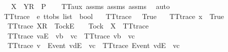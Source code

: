\begin{isabellebody}
\ \ \ {\isachardoublequoteopen}{\isacharbrackleft}{\isacharbrackleft}X\ {\isasymunion}\ Y{\isacharbrackright}\isactrlsub R{\isacharbrackright}\ {\isasymin}\ P{\isachardoublequoteclose}\isanewline
%
\isadelimproof
\ \ %
\endisadelimproof
%
\isatagproof
{}\isamarkupfalse%
\ TT{}{\isacharunderscore}aux{}\ assms{\isacharparenleft}{}{\isacharparenright}\ assms{\isacharparenleft}{}{\isacharparenright}\ assms{\isacharparenleft}{}{\isacharparenright}\ \isamarkupfalse%
\ auto%
\endisatagproof
{\isafoldproof}%
%
\isadelimproof
\isanewline
%
\endisadelimproof
\isanewline
{}\isamarkupfalse%
\ TT{}{\isacharunderscore}trace\ {\isacharcolon}{\isacharcolon}\ {\isachardoublequoteopen}{\isacharprime}e\ ttobs\ list\ {\isasymRightarrow}\ bool{\isachardoublequoteclose}\ \isanewline
\ \ {\isachardoublequoteopen}TT{}{\isacharunderscore}trace\ {\isacharbrackleft}{\isacharbrackright}\ {\isacharequal}\ True{\isachardoublequoteclose}\ {\isacharbar}\isanewline
\ \ {\isachardoublequoteopen}TT{}{\isacharunderscore}trace\ {\isacharbrackleft}x{\isacharbrackright}\ {\isacharequal}\ True{\isachardoublequoteclose}\ {\isacharbar}\isanewline
\ \ {\isachardoublequoteopen}TT{}{\isacharunderscore}trace\ {\isacharparenleft}{\isacharbrackleft}X{\isacharbrackright}\isactrlsub R\ {\isacharhash}\ {\isacharbrackleft}Tock{\isacharbrackright}\isactrlsub E\ {\isacharhash}\ {\isasymrho}{\isacharparenright}\ {\isacharequal}\ {\isacharparenleft}Tock\ {\isasymnotin}\ X\ {\isasymand}\ TT{}{\isacharunderscore}trace\ {\isasymrho}{\isacharparenright}{\isachardoublequoteclose}\ {\isacharbar}\isanewline
\ \ {\isachardoublequoteopen}TT{}{\isacharunderscore}trace\ {\isacharparenleft}{\isacharbrackleft}va{\isacharbrackright}\isactrlsub E\ {\isacharhash}\ vb\ {\isacharhash}\ vc{\isacharparenright}\ {\isacharequal}\ TT{}{\isacharunderscore}trace\ {\isacharparenleft}vb\ {\isacharhash}\ vc{\isacharparenright}{\isachardoublequoteclose}\ {\isacharbar}\isanewline
\ \ {\isachardoublequoteopen}TT{}{\isacharunderscore}trace\ {\isacharparenleft}v\ {\isacharhash}\ {\isacharbrackleft}Event\ vd{\isacharbrackright}\isactrlsub E\ {\isacharhash}\ vc{\isacharparenright}\ {\isacharequal}\ TT{}{\isacharunderscore}trace\ {\isacharparenleft}{\isacharbrackleft}Event\ vd{\isacharbrackright}\isactrlsub E\ {\isacharhash}\ vc{\isacharparenright}{\isachardoublequoteclose}\ {\isacharbar}\isanewline

\end{isabellebody}
